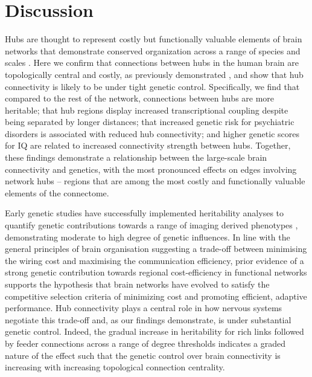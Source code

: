 \section{Discussion}

Hubs are thought to represent costly but functionally valuable elements of brain networks \citep{VandenHeuvel2012} that demonstrate conserved organization across a range of species and scales \citep{Harriger2012,Towlson2013,VandenHeuvel2011,Zamora-Lopez2010}. Here we confirm that connections between hubs in the human brain are topologically central and costly, as previously demonstrated \citep{VandenHeuvel2012}, and show that hub connectivity is likely to be under tight genetic control. Specifically, we find that compared to the rest of the network, connections between hubs are more heritable; that hub regions display increased transcriptional coupling despite being separated by longer distances; that increased genetic risk for psychiatric disorders is associated with reduced hub connectivity; and higher genetic scores for IQ are related to increased connectivity strength between hubs. Together, these findings demonstrate a relationship between the large-scale brain connectivity and genetics, with the most pronounced effects on edges involving network hubs -- regions that are among the most costly and functionally valuable elements of the connectome.

Early genetic studies have successfully implemented heritability analyses to quantify genetic contributions towards a range of imaging derived phenotypes \citep{Colclough2017,Fornito2011,Peper2007,Roshchupkin2016,Shen2014,Sinclair2015,Sudre2017,Thompson2001}, demonstrating moderate to high degree of genetic influences. In line with the general principles of brain organisation suggesting a trade-off between minimising the wiring cost and maximising the communication efficiency, prior evidence of a strong genetic contribution towards regional cost-efficiency in functional networks \citep{Fornito2011} supports the hypothesis that brain networks have evolved to satisfy the competitive selection criteria of minimizing cost and promoting efficient, adaptive performance. Hub connectivity plays a central role in how nervous systems negotiate this trade-off \citep{VandenHeuvel2013b}  and, as our findings demonstrate, is under substantial genetic control. Indeed, the gradual increase in heritability for rich links followed by feeder connections across a range of degree thresholds indicates a graded nature of the effect such that the genetic control over brain connectivity is increasing with increasing topological connection centrality.

